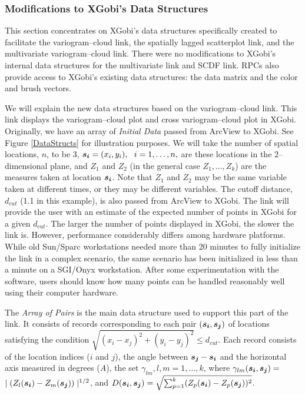 \subsubsection{Modifications to XGobi's Data Structures}

This section concentrates on XGobi's 
data structures specifically created to facilitate
the variogram--cloud link, the spatially lagged scatterplot link, and
the multivariate variogram--cloud link.
There were no modifications to XGobi's internal data
structures for the multivariate link and SCDF
link. RPCs also provide access to XGobi's existing data
structures: the data matrix and the color and brush vectors. 



We will explain the new data structures based on
the variogram--cloud link.  This link displays the variogram--cloud plot
and cross variogram--cloud plot in XGobi.
Originally, we have an array of {\it Initial Data} passed from ArcView
to XGobi.  See Figure \ref{DataStructs} for illustration purposes. We
will take the number of spatial locations, $n$, 
to be 3, $\mbox{\boldmath$s_i$} =
(x_i, y_i),~~i=1,\ldots,n,$ are these locations in the
2--dimensional plane, and $Z_1$ and $Z_2$ (in the general case $Z_1,
\ldots, Z_k$) are the measures taken at location $\mbox{\boldmath$s_i$}$.
Note that $Z_1$ and $Z_2$ may be the same variable taken at different
times, or they may be different variables.  
The cutoff distance, $d_{cut}$ (1.1 in this example), 
is also passed from ArcView to XGobi. 
The link will provide the user with an estimate of the expected
number of points in XGobi for a given $d_{cut}$. The larger the
number of points displayed in XGobi, the slower the link is.
However, performance considerably differs among hardware
platforms. While old Sun/Sparc workstations needed more
than 20 minutes to fully initialize the link in a complex
scenario, the same scenario has been initialized in less than
a minute on a SGI/Onyx workstation.
After some experimentation with the software, users
should know how many points can be handled reasonably well
using their computer hardware.

The {\it Array of Pairs} is the main data structure used to support
this part of the link. It 
consists of records corresponding to each pair 
$(\mbox{\boldmath$s_i$},\mbox{\boldmath$s_j$})$ of locations 
satisfying the condition
$\sqrt{(x_i - x_j)^2 + (y_i - y_j)^2} \leq d_{cut}$.
Each record consists of the location indices ($i$ and $j$), 
the angle between $\mbox{\boldmath$s_j$}-\mbox{\boldmath$s_i$}$
and the horizontal axis measured in degrees ($A$), the set 
$\gamma_{lm}, l, m = 1,\ldots,k$, 
where $\gamma_{lm} (\mbox{\boldmath$s_i$}, \mbox{\boldmath$s_j$}) = $
%
$\mid (Z_l(\mbox{\boldmath$s_i$}) - Z_m(\mbox{\boldmath$s_j$})) 
  \mid^{1/2}$, and
$D (\mbox{\boldmath$s_i$}, \mbox{\boldmath$s_j$}) = 
\sqrt{\sum_{p=1}^k (Z_p(\mbox{\boldmath$s_i$}) - 
  Z_p(\mbox{\boldmath$s_j$}))^2}$. 

